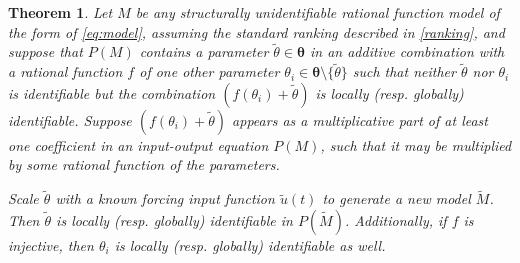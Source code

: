 \documentclass[a4paper,fleqn]{cas-dc}
\newtheorem{theorem}{Theorem}
\theoremstyle{definition}
\begin{document}
\begin{theorem} \label{scaling_1d}
    Let $M$ be any structurally unidentifiable rational function model of the form of \cref{eq:model}, assuming the standard ranking described in \cref{ranking}, and suppose that $P(M)$ contains a parameter $\tilde{\theta} \in \pmb{\theta}$ in an additive combination with a rational function $f$ of one other parameter $\theta_i \in \pmb{\theta} \setminus \{\tilde{\theta}\}$ such that neither $\tilde{\theta}$ nor $\theta_i$ is identifiable but the combination $(f(\theta_i) + \tilde{\theta})$ is locally (resp. globally) identifiable. Suppose $(f(\theta_i) + \tilde{\theta})$ appears as a  multiplicative part of at least one coefficient in an input-output equation $P(M)$, such that it may be multiplied by some rational function of the parameters.
 
    Scale $\tilde{\theta}$ with a known forcing input function $\tilde{u}(t)$ to generate a new model $\tilde{M}$. 
    Then $\tilde{\theta}$ is locally (resp. globally) identifiable in $P(\tilde{M})$. Additionally, if $f$ is injective, then $\theta_i$ is locally (resp. globally) identifiable as well.
\end{theorem}
\end{document}
